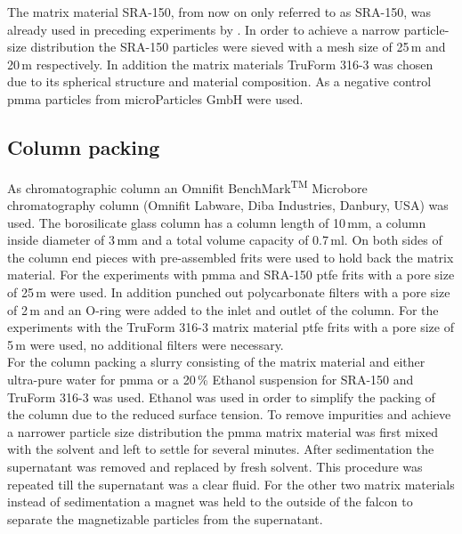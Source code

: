 The matrix material SRA-150, from now on only referred to as SRA-150, was already used in preceding experiments by \cite{AndreMaster}. In order to achieve a narrow particle-size distribution the SRA-150 particles were sieved with a mesh size of 25\,\textmu m and 20\,\textmu m respectively. In addition the matrix materials TruForm 316-3 was chosen due to its spherical structure and material composition. 
As a negative control \gls{pmma} particles from microParticles GmbH were used.  

\subsection{Column packing}
\label{subsec:col_pack}
As chromatographic column an Omnifit\textsuperscript{\textregistered} BenchMark\textsuperscript{TM} Microbore chromatography column (Omnifit Labware, Diba Industries, Danbury, USA) was used. The borosilicate glass column has a column length of 10\,mm, a column inside diameter of 3\,mm and a total volume capacity of 0.7\,ml. On both sides of the column end pieces with pre-assembled frits were used to hold back the matrix material. For the experiments with \gls{pmma} and SRA-150 \gls{ptfe} frits with a pore size of 25\,\textmu m were used. In addition punched out polycarbonate filters with a pore size of 2\,\textmu m and an O-ring were added to the inlet and outlet of the column. For the experiments with the TruForm 316-3 matrix material \gls{ptfe} frits with a pore size of 5\,\textmu m were used, no additional filters were necessary. \\   
For the column packing a slurry consisting of the matrix material and either ultra-pure water for \gls{pmma} or a 20\,\% Ethanol suspension for SRA-150 and TruForm 316-3 was used. Ethanol was used in order to simplify the packing of the column due to the reduced surface tension. To remove impurities and achieve a narrower particle size distribution the \gls{pmma} matrix material was first mixed with the solvent and left to settle for several minutes. After sedimentation the supernatant was removed and replaced by fresh solvent. This procedure was repeated till the supernatant was a clear fluid. For the other two matrix materials instead of sedimentation a magnet was held to the outside of the falcon to separate the magnetizable particles from the supernatant.\\   
